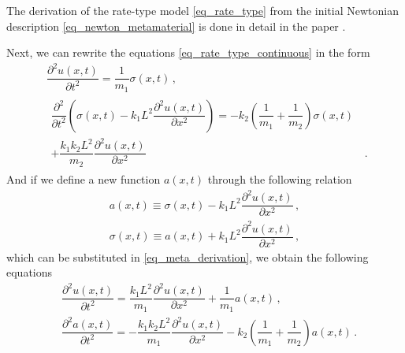 \documentclass[11pt,a4paper,oneside,openright]{report} %
\begin{document}
The derivation of the rate-type model \eqref{eq_rate_type} from the initial Newtonian description \eqref{eq_newton_metamaterial} is done in detail in the paper \cite{cichra}. 

Next, we can rewrite the equations \eqref{eq_rate_type_continuous} in the form
\begin{subequations}\label{eq_meta_derivation}
    \begin{align}
        & \dfrac{\partial^2 u(x,t)}{\partial t^2} = \dfrac{1}{m_1} \sigma(x,t) \, , \\[5pt]
        & \begin{aligned}
            \dfrac{\partial^2 }{\partial t^2} \left(\sigma(x,t) - k_1 L^2  \dfrac{\partial^2 u(x,t)}{\partial x^2} \right)  = - k_2 \left( \dfrac{1}{m_1} + \dfrac{1}{m_2} \right) \sigma(x,t) & \\ + \dfrac{k_1 k_2 L^2}{m_2} \dfrac{\partial^2 u(x,t)}{\partial x^2} & \, .
        \end{aligned}
    \end{align}
\end{subequations}
And if we define a new function $a(x,t)$ through the following relation
\begin{subequations}\label{a_def}
    \begin{align}
    a(x,t) \equiv \sigma(x,t) - k_1 L^2 \dfrac{\partial^2 u(x,t)}{\partial x^2}  \, , \\[5pt]
    \sigma(x,t) \equiv a(x,t) + k_1 L^2 \dfrac{\partial^2 u(x,t)}{\partial x^2}  \, ,
    \end{align}
\end{subequations}
which can be substituted in \eqref{eq_meta_derivation}, we obtain the following equations
\begin{subequations}\label{eq_continuous_meta}
    \begin{align}
        & \dfrac{\partial^2 u(x,t)}{\partial t^2} = \dfrac{k_1 L^2}{m_1}\dfrac{\partial^2 u(x,t)}{\partial x^2} + \dfrac{1}{m_1}a(x,t) \, , \\[5pt]
        & \dfrac{\partial^2 a(x,t)}{\partial t^2} = - \dfrac{k_1 k_2 L^2}{m_1} \dfrac{\partial^2 u(x,t)}{\partial x^2} - k_2 \left( \dfrac{1}{m_1} + \dfrac{1}{m_2} \right) a(x,t) \, .
    \end{align}
\end{subequations}
\end{document}
